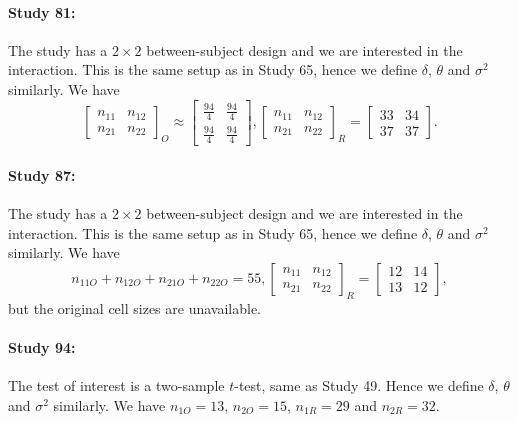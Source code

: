 \documentclass[11pt]{article}
\theoremstyle{definition}
\theoremstyle{custom}
\begin{document}
  \paragraph{Study 81: \citet{Shnabel:2008ck}}
  The study has a $2 \times 2$ between-subject design and we are interested in the interaction. This is the same setup as in Study 65, hence we define $\delta$, $\theta$ and $\sigma^2$ similarly. We have
  \[
  \begin{bmatrix}
  n_{11} & n_{12} \\
  n_{21} & n_{22}
  \end{bmatrix}_O \approx \begin{bmatrix}
  \frac{94}{4} & \frac{94}{4} \\
  \frac{94}{4} & \frac{94}{4}
  \end{bmatrix}, \begin{bmatrix}
  n_{11} & n_{12} \\
  n_{21} & n_{22}
  \end{bmatrix}_R = \begin{bmatrix}
  33 & 34 \\
  37 & 37
  \end{bmatrix}.
  \]

  \paragraph{Study 87: \citet{Goff:2008ho}}
  The study has a $2 \times 2$ between-subject design and we are interested in the interaction. This is the same setup as in Study 65, hence we define $\delta$, $\theta$ and $\sigma^2$ similarly. We have
  \[
  n_{11O} + n_{12O} + n_{21O} + n_{22O} = 55, \begin{bmatrix}
  n_{11} & n_{12} \\
  n_{21} & n_{22}
  \end{bmatrix}_R = \begin{bmatrix}
  12 & 14 \\
  13 & 12
  \end{bmatrix},
  \]
  but the original cell sizes are unavailable.

  \paragraph{Study 94: \citet{McCrea:2008wu}}
  The test of interest is a two-sample $t$-test, same as Study 49. Hence we define $\delta$, $\theta$ and $\sigma^2$ similarly. We have $n_{1O} = 13$, $n_{2O} = 15$, $n_{1R} = 29$ and $n_{2R} = 32$.
\end{document}
